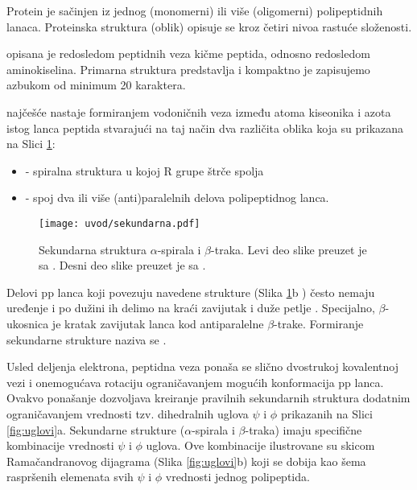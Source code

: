 Protein je sačinjen iz jednog (monomerni) ili više (oligomerni) polipeptidnih lanaca.
Proteinska struktura (oblik) opisuje se kroz četiri nivoa rastuće složenosti.

 opisana je redosledom peptidnih veza kičme peptida,
odnosno redosledom aminokiselina. Primarna struktura predstavlja  i kompaktno je zapisujemo azbukom od minimum 20 karaktera.

 najčešće nastaje formiranjem vodoničnih veza
između atoma kiseonika i azota istog lanca peptida stvarajući na taj način
dva različita oblika koja su prikazana na Slici \ref{fig:sekundarna}:
\begin{itemize}
  \item {}  - spiralna struktura u kojoj R grupe štrče spolja
  \item {}  - spoj dva ili više (anti)paralelnih delova polipeptidnog lanca.
\end{itemize}

\begin{figure}[th]
\centering
\hspace*{-2.0cm} 
\texttt{[image: uvod/sekundarna.pdf]}
\caption {
  Sekundarna struktura $\alpha$-spirala i $\beta$-traka. \footnotesize Levi deo slike preuzet je sa \parencite{sekundarna_ref_a}.
  Desni deo slike preuzet je sa \parencite{sekundarna_ref_b}.
}
\label{fig:sekundarna}
\end{figure}

Delovi pp lanca  koji povezuju navedene strukture (Slika \ref{fig:sekundarna}b
) često nemaju uređenje i po dužini ih delimo na kraći zavijutak i duže petlje
. Specijalno, $\beta$-ukosnica  je
kratak zavijutak lanca kod antiparalelne $\beta$-trake.  Formiranje sekundarne
strukture naziva se  .

Usled deljenja elektrona,  peptidna veza ponaša se slično dvostrukoj kovalentnoj
vezi i onemogućava rotaciju ograničavanjem mogućih konformacija pp lanca.
Ovakvo ponašanje dozvoljava kreiranje pravilnih sekundarnih struktura
dodatnim ograničavanjem vrednosti tzv.  dihedralnih uglova $\psi$ i $\phi$ prikazanih
na Slici \ref{fig:uglovi}a. 
Sekundarne strukture ($\alpha$-spirala i $\beta$-traka) imaju specifične kombinacije
vrednosti $\psi$ i $\phi$ uglova. Ove kombinacije ilustrovane su skicom
Ramačandranovog dijagrama (Slika \ref{fig:uglovi}b) koji se dobija kao
šema raspršenih elemenata  svih $\psi$ i $\phi$ vrednosti jednog polipeptida.


